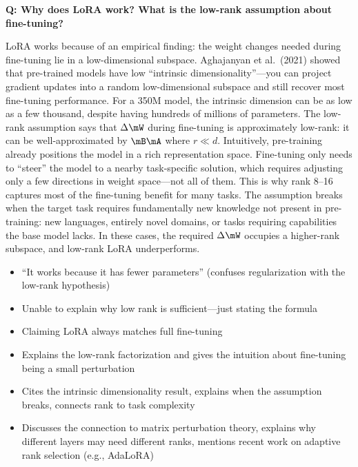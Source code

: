 \begin{interviewq}
\textbf{Q: Why does LoRA work? What is the low-rank assumption about fine-tuning?}

 \quad {} \quad \badgefreq{\freqmed}

\stronganswer LoRA works because of an empirical finding: the weight changes needed during fine-tuning lie in a low-dimensional subspace. Aghajanyan et al.\ (2021) showed that pre-trained models have low ``intrinsic dimensionality''---you can project gradient updates into a random low-dimensional subspace and still recover most fine-tuning performance. For a 350M model, the intrinsic dimension can be as low as a few thousand, despite having hundreds of millions of parameters. The low-rank assumption says that $\Delta \mW$ during fine-tuning is approximately low-rank: it can be well-approximated by $\mB \mA$ where $r \ll d$. Intuitively, pre-training already positions the model in a rich representation space. Fine-tuning only needs to ``steer'' the model to a nearby task-specific solution, which requires adjusting only a few directions in weight space---not all of them. This is why rank 8--16 captures most of the fine-tuning benefit for many tasks. The assumption breaks when the target task requires fundamentally new knowledge not present in pre-training: new languages, entirely novel domains, or tasks requiring capabilities the base model lacks. In these cases, the required $\Delta \mW$ occupies a higher-rank subspace, and low-rank LoRA underperforms.

\redflags
\begin{itemize}
    \item ``It works because it has fewer parameters'' (confuses regularization with the low-rank hypothesis)
    \item Unable to explain why low rank is sufficient---just stating the formula
    \item Claiming LoRA always matches full fine-tuning
\end{itemize}


\goodgreat
\begin{itemize}
    \item {} Explains the low-rank factorization and gives the intuition about fine-tuning being a small perturbation
    \item {} Cites the intrinsic dimensionality result, explains when the assumption breaks, connects rank to task complexity
    \item {} Discusses the connection to matrix perturbation theory, explains why different layers may need different ranks, mentions recent work on adaptive rank selection (e.g., AdaLoRA)
\end{itemize}

\end{interviewq}


